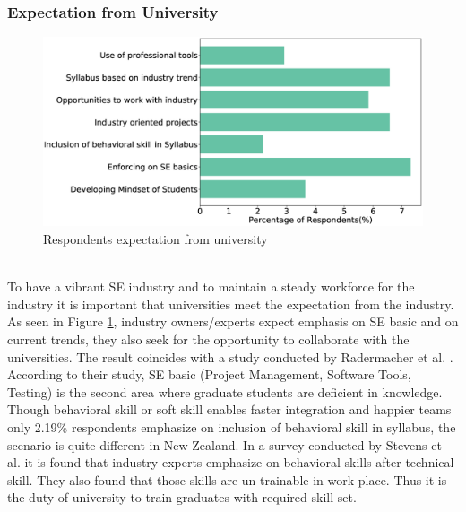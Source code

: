 \subsubsection{Expectation from University}

\label{Expectation from University}
\begin{figure}[htbp]
\includegraphics[scale=0.28]{Figures/UniversityExpectation.eps} 
\caption{Respondents expectation from university}
\label{fig:university expectation}
\end{figure}
\hfill\\
To have a vibrant SE industry and to maintain a steady workforce for the industry it is important that universities meet the expectation from the industry. As seen in Figure \ref{fig:university expectation}, industry owners/experts expect emphasis on SE basic and on current trends, they also seek for the opportunity to collaborate with the universities. The result coincides with  a study conducted by Radermacher et al. \citep{Radermacher2013}. According to their study, SE basic (Project Management, Software Tools, Testing) is the second area where graduate students are deficient in knowledge\citep{Radermacher2013}. Though behavioral skill or soft skill enables faster integration and happier teams only 2.19\% respondents emphasize on inclusion of behavioral skill in syllabus, the scenario is quite different in New Zealand. In a survey conducted by Stevens et al.\citep{Stevens2016} it is found that industry experts emphasize on behavioral skills after technical skill. They also found that those skills are un-trainable in work place. Thus it is the duty of university to train graduates with required skill set.
